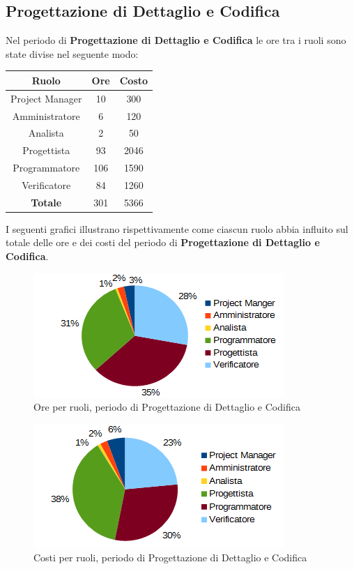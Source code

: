 	\subsection{Progettazione di Dettaglio e Codifica}
	Nel periodo di \textbf{Progettazione di Dettaglio e Codifica} le ore tra i ruoli sono state divise nel seguente modo: \\
	\begin{table}[H]
		\centering
		\begin{tabular}{|c|c|c|}
			\hline
			\textbf{Ruolo}		& \textbf{Ore}	& \textbf{Costo} \\
			\hline
			Project Manager		& 10			& 300	\\
			Amministratore		& 6				& 120	\\
			Analista			& 2				& 50	\\
			Progettista			& 93			& 2046	\\
			Programmatore		& 106			& 1590	\\
			Verificatore		& 84			& 1260	\\
			\hline
			\textbf{Totale}		& 301			& 5366	\\
			\hline
		\end{tabular}
		\end{table}
	I seguenti grafici illustrano rispettivamente come ciascun ruolo abbia influito sul totale
delle ore e dei costi del periodo di \textbf{Progettazione di Dettaglio e Codifica}. \\
	\begin{figure}[H]
		\centering
		\includegraphics[width=1\linewidth]{immagini/grafici/progettazione_dettaglio_codifica-torta.png}
		\caption{Ore per ruoli, periodo di Progettazione di Dettaglio e Codifica}
	\end{figure}
	\begin{figure}[H]
		\centering
		\includegraphics[width=1\linewidth]{immagini/grafici/progettazione_dettaglio_codifica-torta-costo.png}
		\caption{Costi per ruoli, periodo di Progettazione di Dettaglio e Codifica}
	\end{figure}
